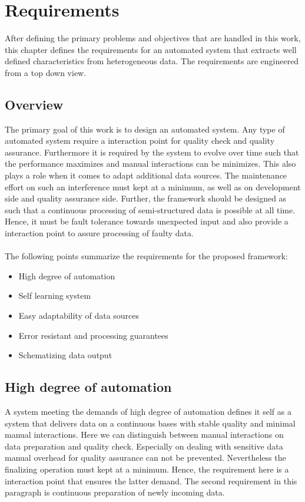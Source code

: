\chapter{Requirements\label{cha:chapter3}}

After defining the primary problems and objectives that are handled in this work, this chapter defines the requirements for an automated system that extracts well defined characteristics from heterogeneous data. The requirements are engineered from a top down view.

\section{Overview\label{sec:reqoverview}}

The primary goal of this work is to design an automated system. Any type of automated system require a interaction point for quality check and quality assurance. Furthermore it is required by the system to evolve over time such that the performance maximizes and manual interactions can be minimizes. This also plays a role when it comes to adapt additional data sources. The maintenance effort on such an interference must kept at a minimum, as well as on development side and quality assurance side. Further, the framework should be designed as such that a continuous processing of semi-structured data is possible at all time. Hence, it must be fault tolerance towards unexpected input and also provide a interaction point to assure processing of faulty data.
\\\\
The following points summarize the requirements for the proposed framework:
\begin{itemize}
\item High degree of automation
\item Self learning system
\item Easy adaptability of data sources
\item Error resistant and processing guarantees
\item Schematizing data output 
\end{itemize}

\section{High degree of automation}

A system meeting the demands of high degree of automation defines it self as a system that delivers data on a continuous bases with stable quality and minimal manual interactions. Here we can distinguish between manual interactions on data preparation and quality check. Especially on dealing with sensitive data manual overhead for quality assurance can not be prevented. Nevertheless the finalizing operation must kept at a minimum. Hence, the requirement here is a interaction point that ensures the latter demand. The second requirement in this paragraph is continuous preparation of newly incoming data.


